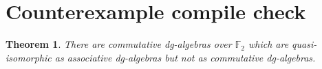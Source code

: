 \documentclass{amsart}
\newtheorem{theorem}{Theorem}[section]
\begin{document}
\section{Counterexample compile check}
\begin{theorem}\label{mycounterexample}
There are commutative dg-algebras over $\mathbb F_2$ which are
quasi-isomorphic as associative dg-algebras but not as commutative dg-algebras.
\end{theorem}

\end{document}
